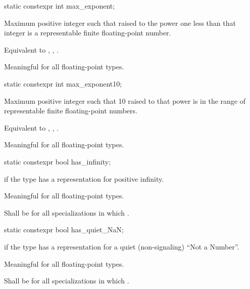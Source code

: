 %
\begin{itemdecl}
static constexpr int max_exponent;
\end{itemdecl}

\begin{itemdescr}
\pnum
Maximum positive integer such that
raised to the power one less than that integer is a representable finite
floating-point number.
\begin{footnote}
Equivalent to ,
, .
\end{footnote}

\pnum
Meaningful for all floating-point types.
\end{itemdescr}

%
\begin{itemdecl}
static constexpr int max_exponent10;
\end{itemdecl}

\begin{itemdescr}
\pnum
Maximum positive integer such that 10 raised to that power is in the
range of representable finite floating-point numbers.
\begin{footnote}
Equivalent to
, , .
\end{footnote}

\pnum
Meaningful for all floating-point types.
\end{itemdescr}

%
\begin{itemdecl}
static constexpr bool has_infinity;
\end{itemdecl}

\begin{itemdescr}
\pnum
{} if the type has a representation for positive infinity.

\pnum
Meaningful for all floating-point types.

\pnum
Shall be
for all specializations in which
.
\end{itemdescr}

%
\begin{itemdecl}
static constexpr bool has_quiet_NaN;
\end{itemdecl}

\begin{itemdescr}
\pnum
{} if the type has a representation for a quiet (non-signaling) ``Not a
Number''.

\pnum
Meaningful for all floating-point types.

\pnum
Shall be
for all specializations in which
.
\end{itemdescr}

